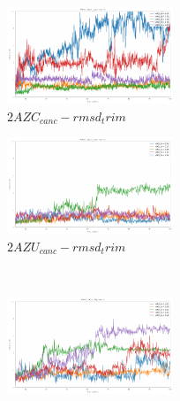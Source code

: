 \begin{figure}[!ht]
\centering
   \begin{subfigure}{.45\textwidth}
     \centering
     \includegraphics[width=.95\linewidth]{chapter4/2AZC_canc/2AZC_canc-rmsd-trim}
     \caption{$2AZC_{canc}-rmsd_trim$}
     \label{fig:2AZC_canc-rmsd_trim}
   \end{subfigure}
   \begin{subfigure}{.45\textwidth}
     \centering
     \includegraphics[width=.95\linewidth]{chapter4/2AZU_canc/2AZU_canc-rmsd-trim}
     \caption{$2AZU_{canc}-rmsd_trim$}
     \label{fig:2AZU_canc-rmsd_trim}
   \end{subfigure}
   \\
   \begin{subfigure}{.45\textwidth}
     \centering
     \includegraphics[width=.95\linewidth]{chapter4/2AZC_flip/2AZC_flip-rmsd-trim}

\end{subfigure}
\end{figure}
